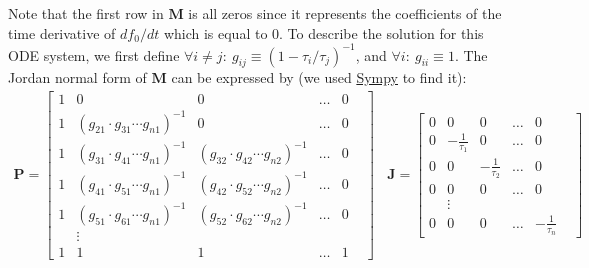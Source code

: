 \documentclass{article}
\begin{document}
Note that the first row in $\mathbf{M}$ is all zeros since it represents the coefficients of the time derivative of $d f_0/dt$ which is equal to $0$. To describe the solution for this ODE system, we first define $\forall i \neq j:~g_{ij} \equiv (1 - \tau_i/\tau_j)^{-1}$, and $\forall i:~g_{ii} \equiv 1$. The Jordan normal form of $\mathbf{M}$ can be expressed by (we used \href{https://www.sympy.org/}{Sympy} to find it):
\begin{eqnarray}
\mathbf{P} =
  \begin{bmatrix}
    1 & 0 & 0 & \ldots & 0 \\
    1 & (g_{21}\cdot g_{31} \cdots g_{n1})^{-1} & 0 & \ldots & 0 \\
    1 & (g_{31}\cdot g_{41} \cdots g_{n1})^{-1} & (g_{32}\cdot g_{42} \cdots g_{n2})^{-1} & \ldots & 0 \\
    1 & (g_{41}\cdot g_{51} \cdots g_{n1})^{-1} & (g_{42}\cdot g_{52} \cdots g_{n2})^{-1} & \ldots & 0 \\
    1 & (g_{51}\cdot g_{61} \cdots g_{n1})^{-1} & (g_{52}\cdot g_{62} \cdots g_{n2})^{-1} & \ldots & 0 \\
     & \vdots & & & & \\
    1 & 1 & 1 & \ldots & 1
\end{bmatrix}
~~~~
\mathbf{J} =
  \begin{bmatrix}
    0 & 0 & 0 & \ldots & 0 \\
    0 & -\frac{1}{\tau_1} & 0 & \ldots & 0 \\
    0 & 0 & -\frac{1}{\tau_2} & \ldots & 0 \\
    0 & 0 & 0 & \ldots & 0 \\
     & \vdots & & & & \\
    0 & 0 & 0 & \ldots & -\frac{1}{\tau_n}
\end{bmatrix}
\end{eqnarray}
\end{document}
